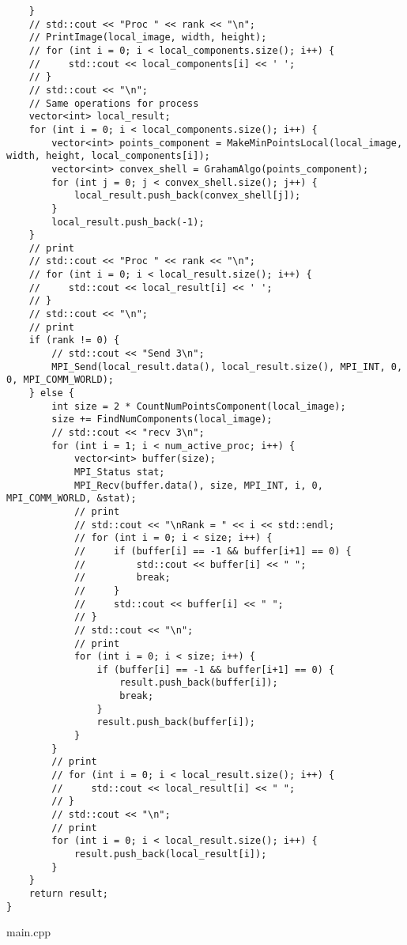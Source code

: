 \documentclass{report}
\begin{document}
\begin{lstlisting}
    }
    // std::cout << "Proc " << rank << "\n";
    // PrintImage(local_image, width, height);
    // for (int i = 0; i < local_components.size(); i++) {
    //     std::cout << local_components[i] << ' ';
    // }
    // std::cout << "\n";
    // Same operations for process
    vector<int> local_result;
    for (int i = 0; i < local_components.size(); i++) {
        vector<int> points_component = MakeMinPointsLocal(local_image, width, height, local_components[i]);
        vector<int> convex_shell = GrahamAlgo(points_component);
        for (int j = 0; j < convex_shell.size(); j++) {
            local_result.push_back(convex_shell[j]);
        }
        local_result.push_back(-1);
    }
    // print
    // std::cout << "Proc " << rank << "\n";
    // for (int i = 0; i < local_result.size(); i++) {
    //     std::cout << local_result[i] << ' ';
    // }
    // std::cout << "\n";
    // print
    if (rank != 0) {
        // std::cout << "Send 3\n";
        MPI_Send(local_result.data(), local_result.size(), MPI_INT, 0, 0, MPI_COMM_WORLD);
    } else {
        int size = 2 * CountNumPointsComponent(local_image);
        size += FindNumComponents(local_image);
        // std::cout << "recv 3\n";
        for (int i = 1; i < num_active_proc; i++) {
            vector<int> buffer(size);
            MPI_Status stat;
            MPI_Recv(buffer.data(), size, MPI_INT, i, 0, MPI_COMM_WORLD, &stat);
            // print
            // std::cout << "\nRank = " << i << std::endl;
            // for (int i = 0; i < size; i++) {
            //     if (buffer[i] == -1 && buffer[i+1] == 0) {
            //         std::cout << buffer[i] << " ";
            //         break;
            //     }
            //     std::cout << buffer[i] << " ";
            // }
            // std::cout << "\n";
            // print
            for (int i = 0; i < size; i++) {
                if (buffer[i] == -1 && buffer[i+1] == 0) {
                    result.push_back(buffer[i]);
                    break;
                }
                result.push_back(buffer[i]);
            }
        }
        // print
        // for (int i = 0; i < local_result.size(); i++) {
        //     std::cout << local_result[i] << " ";
        // }
        // std::cout << "\n";
        // print
        for (int i = 0; i < local_result.size(); i++) {
            result.push_back(local_result[i]);
        }
    }
    return result;
}

\end{lstlisting}
main.cpp
\end{document}
